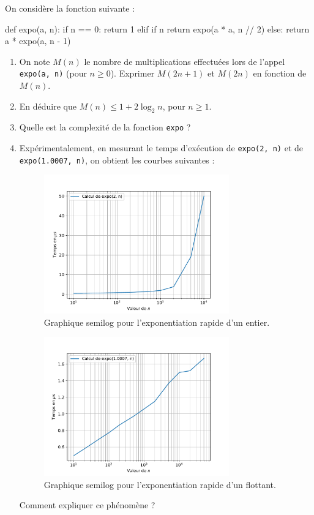 \documentclass{magnoliaold}
\begin{document}

  On considère la fonction suivante :
\begin{pythoncode}
def expo(a, n):
    if n == 0:
        return 1
    elif if n %
        return expo(a * a, n // 2)
    else:
        return a * expo(a, n - 1)
\end{pythoncode}
  \begin{enumerate}
    \item On note $M(n)$ le nombre de multiplications effectuées
          lors de l'appel \verb!expo(a, n)! (pour $n \geq 0$).
          Exprimer $M(2n + 1)$ et $M(2n)$ en fonction de $M(n)$.
    \item En déduire que $M(n) \leq 1 + 2 \log_{2} n$, pour $n \geq 1$.
    \item Quelle est la complexité de la fonction \verb!expo! ?
    \item Expérimentalement, en mesurant le temps d'exécution de \verb!expo(2, n)! et
    de \verb!expo(1.0007, n)!, on obtient
          les courbes suivantes :
          \begin{multicols}{2}
            \begin{figure}[H]
              \centering
              \includegraphics[width = 8cm]{../../commun/images/info-exos-complexite-expo-entier}
              \caption{Graphique semilog pour l'exponentiation rapide d'un entier.}
            \end{figure}
            \begin{figure}[H]
              \centering
              \includegraphics[width = 8cm]{../../commun/images/info-exos-complexite-expo-flottant}
              \caption{Graphique semilog pour l'exponentiation rapide d'un flottant.}
            \end{figure}
          \end{multicols}
          Comment expliquer ce phénomène ?
  \end{enumerate}
\end{document}
